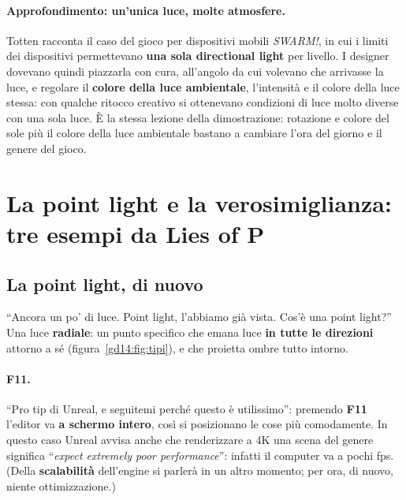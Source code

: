 \paragraph{Approfondimento: un'unica luce, molte atmosfere.} Totten racconta il
caso del gioco per dispositivi mobili \emph{SWARM!}, in cui i limiti dei dispositivi
permettevano \textbf{una sola directional light} per livello. I designer dovevano
quindi piazzarla con cura, all'angolo da cui volevano che arrivasse la luce, e
regolare il \textbf{colore della luce ambientale}, l'intensità e il colore della
luce stessa: con qualche ritocco creativo si ottenevano condizioni di luce molto
diverse con una sola luce. È la stessa lezione della dimostrazione: rotazione e
colore del sole più il colore della luce ambientale bastano a cambiare l'ora del
giorno e il genere del gioco.

\section{La point light e la verosimiglianza: tre esempi da Lies of P}
\label{gd14:sec:liesofp}



\subsection{La point light, di nuovo}

``Ancora un po' di luce. Point light, l'abbiamo già vista. Cos'è una point light?''
Una luce \textbf{radiale}: un punto specifico che emana luce \textbf{in tutte le
direzioni} attorno a sé (figura~\ref{gd14:fig:tipi}), e che proietta ombre tutto
intorno.

\paragraph{F11.} ``Pro tip di Unreal, e seguitemi perché questo è utilissimo'':
premendo \textbf{F11} l'editor va \textbf{a schermo intero}, così si posizionano le
cose più comodamente. In questo caso Unreal avvisa anche che renderizzare a 4K una
scena del genere significa ``\emph{expect extremely poor performance}'': infatti
il computer va a pochi fps. (Della \textbf{scalabilità} dell'engine si parlerà in un
altro momento; per ora, di nuovo, niente ottimizzazione.)

